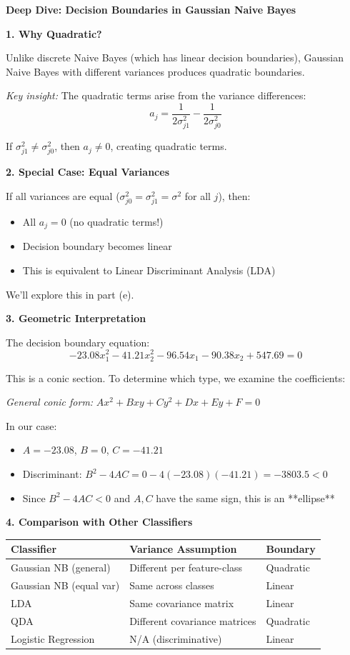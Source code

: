 \documentclass[12pt]{article}
\begin{document}
\begin{explanation}
\textbf{Deep Dive: Decision Boundaries in Gaussian Naive Bayes}

\textbf{1. Why Quadratic?}

Unlike discrete Naive Bayes (which has linear decision boundaries), Gaussian Naive Bayes with different variances produces quadratic boundaries.

\textit{Key insight:} The quadratic terms arise from the variance differences:
\[
a_j = \frac{1}{2\sigma_{j1}^2} - \frac{1}{2\sigma_{j0}^2}
\]

If $\sigma_{j1}^2 \neq \sigma_{j0}^2$, then $a_j \neq 0$, creating quadratic terms.

\textbf{2. Special Case: Equal Variances}

If all variances are equal ($\sigma_{j0}^2 = \sigma_{j1}^2 = \sigma^2$ for all $j$), then:
\begin{itemize}
    \item All $a_j = 0$ (no quadratic terms!)
    \item Decision boundary becomes linear
    \item This is equivalent to Linear Discriminant Analysis (LDA)
\end{itemize}

We'll explore this in part (e).

\textbf{3. Geometric Interpretation}

The decision boundary equation:
\[
-23.08 x_1^2 - 41.21 x_2^2 - 96.54 x_1 - 90.38 x_2 + 547.69 = 0
\]

This is a conic section. To determine which type, we examine the coefficients:

\textit{General conic form:} $Ax^2 + Bxy + Cy^2 + Dx + Ey + F = 0$

In our case:
\begin{itemize}
    \item $A = -23.08$, $B = 0$, $C = -41.21$
    \item Discriminant: $B^2 - 4AC = 0 - 4(-23.08)(-41.21) = -3803.5 < 0$
    \item Since $B^2 - 4AC < 0$ and $A, C$ have the same sign, this is an **ellipse**
\end{itemize}

\textbf{4. Comparison with Other Classifiers}

\begin{center}
\begin{tabular}{|l|l|l|}
\hline
\textbf{Classifier} & \textbf{Variance Assumption} & \textbf{Boundary} \\
\hline
Gaussian NB (general) & Different per feature-class & Quadratic \\
Gaussian NB (equal var) & Same across classes & Linear \\
LDA & Same covariance matrix & Linear \\
QDA & Different covariance matrices & Quadratic \\
Logistic Regression & N/A (discriminative) & Linear \\
\hline
\end{tabular}
\end{center}
\end{explanation}
\end{document}
